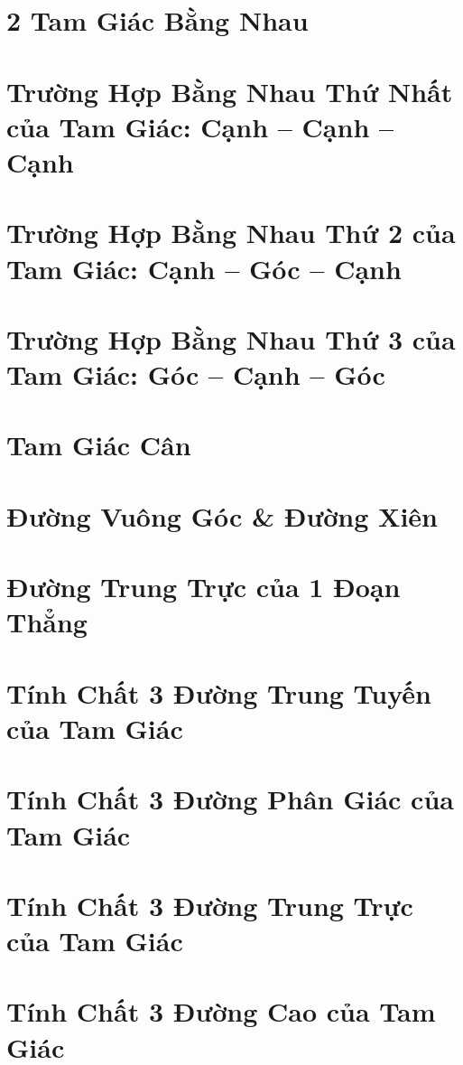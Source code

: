 \documentclass[oneside]{book}
\numberwithin{equation}{section}
\begin{document}
\section{2 Tam Giác Bằng Nhau}

\section{Trường Hợp Bằng Nhau Thứ Nhất của Tam Giác: Cạnh -- Cạnh -- Cạnh}

\section{Trường Hợp Bằng Nhau Thứ 2 của Tam Giác: Cạnh -- Góc -- Cạnh}

\section{Trường Hợp Bằng Nhau Thứ 3 của Tam Giác: Góc -- Cạnh -- Góc}

\section{Tam Giác Cân}

\section{Đường Vuông Góc \& Đường Xiên}

\section{Đường Trung Trực của 1 Đoạn Thẳng}

\section{Tính Chất 3 Đường Trung Tuyến của Tam Giác}

\section{Tính Chất 3 Đường Phân Giác của Tam Giác}

\section{Tính Chất 3 Đường Trung Trực của Tam Giác}

\section{Tính Chất 3 Đường Cao của Tam Giác}
\end{document}
